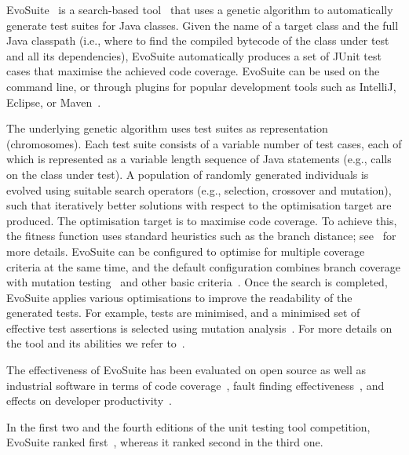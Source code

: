 \documentclass[10pt,conference]{IEEEtran}
\newcommand{\EVOSUITE}{{\sc EvoSuite}\xspace}
\begin{document}
\EVOSUITE~\cite{FrA11c} is a search-based tool~\cite{GoA_TSE12} that
uses a genetic algorithm to automatically generate test suites for
Java classes. Given the name of a target class and the full Java
classpath (i.e., where to find the compiled bytecode of the class
under test and all its dependencies), \EVOSUITE automatically produces
a set of JUnit test cases that maximise the achieved code
coverage. \EVOSUITE can be used on the command line, or through
plugins for popular development tools such as IntelliJ, Eclipse, or Maven~\cite{ICST16_Tool}.

The underlying genetic algorithm uses test suites as representation
(chromosomes). Each test suite consists of a variable number of test
cases, each of which is represented as a variable length sequence of
Java statements (e.g., calls on the class under test). A population of
randomly generated individuals is evolved using suitable search
operators (e.g., selection, crossover and mutation), such that
iteratively better solutions with respect to the optimisation target
are produced. The optimisation target is to maximise code coverage. To
achieve this, the fitness function uses standard heuristics such as
the branch distance; see~\cite{GoA_TSE12} for more details. \EVOSUITE
can be configured to optimise for multiple coverage criteria at the
same time, and the default configuration combines branch coverage with
mutation testing~\cite{emse14_mutation} and other basic
criteria~\cite{rojas2015combining}. Once the search is completed,
\EVOSUITE applies various optimisations to improve the readability of
the generated tests. For example, tests are minimised, and a
minimised set of effective test assertions is selected using mutation
analysis~\cite{10.1109/TSE.2011.93}. For more details on the tool and
its abilities we refer to~\cite{FrA11c,FrA13a}.


The effectiveness of \EVOSUITE has been evaluated on open source as
well as industrial software in terms of code
coverage~\cite{fraser2014large,emse_archive}, fault finding
effectiveness~\cite{shamshiri2015automatically,moein2017}, and effects
on developer productivity~\cite{TOSEM_userstudy,ISSTA15_Study}.

In the first two and the fourth editions of the unit testing tool
competition, \EVOSUITE ranked
first~\cite{evosuiteAtSbst2013,evosuiteAtFittest2013,evosuiteAtSbst2016},
whereas it ranked second in the third one.






\end{document}
